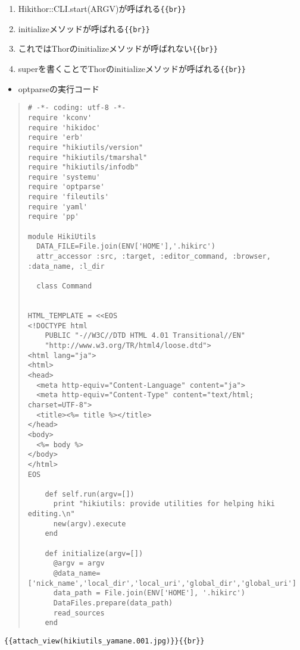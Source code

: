\documentclass[10pt,a4j]{article}
\begin{document}
\begin{enumerate}
\item Hikithor::CLI.start(ARGV)が呼ばれる\verb|{{br}}|
\item initializeメソッドが呼ばれる\verb|{{br}}|
\item これではThorのinitializeメソッドが呼ばれない\verb|{{br}}|
\item superを書くことでThorのinitializeメソッドが呼ばれる\verb|{{br}}|
\end{enumerate}
\begin{itemize}
\item optparseの実行コード
\end{itemize}\begin{quote}\begin{verbatim}
# -*- coding: utf-8 -*-                                                         
require 'kconv'
require 'hikidoc'
require 'erb'
require "hikiutils/version"
require "hikiutils/tmarshal"
require "hikiutils/infodb"
require 'systemu'
require 'optparse'
require 'fileutils'
require 'yaml'
require 'pp'

module HikiUtils
  DATA_FILE=File.join(ENV['HOME'],'.hikirc')
  attr_accessor :src, :target, :editor_command, :browser, :data_name, :l_dir

  class Command


HTML_TEMPLATE = <<EOS
<!DOCTYPE html                                                                  
    PUBLIC "-//W3C//DTD HTML 4.01 Transitional//EN"                         
    "http://www.w3.org/TR/html4/loose.dtd">                                 
<html lang="ja">                                                            
<html>                                                                      
<head>                                                                      
  <meta http-equiv="Content-Language" content="ja">                         
  <meta http-equiv="Content-Type" content="text/html; charset=UTF-8">       
  <title><%= title %></title>                                               
</head>                                                                     
<body>                                                                      
  <%= body %>                                                               
</body>                                                                     
</html>                                                                     
EOS

    def self.run(argv=[])
      print "hikiutils: provide utilities for helping hiki editing.\n"
      new(argv).execute
    end

    def initialize(argv=[])
      @argv = argv
      @data_name=['nick_name','local_dir','local_uri','global_dir','global_uri']
      data_path = File.join(ENV['HOME'], '.hikirc')
      DataFiles.prepare(data_path)
      read_sources
    end

\end{verbatim}\end{quote}
\verb|{{attach_view(hikiutils_yamane.001.jpg)}}|\verb|{{br}}|
\end{document}
